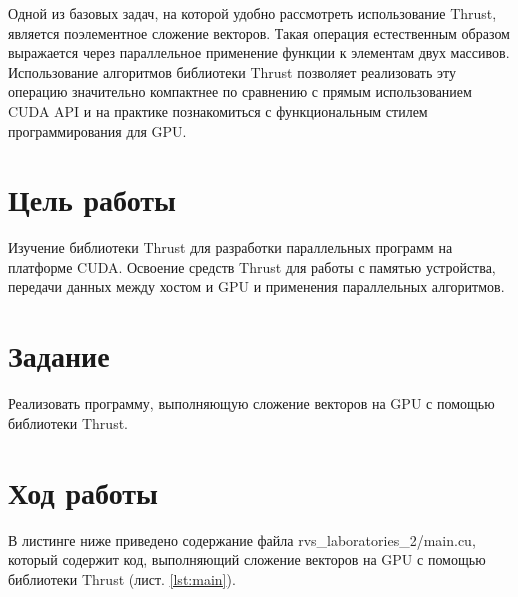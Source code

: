 \documentclass[14pt]{extarticle}
\makeatletter
\newcommand{\numbersections}{\renewcommand{\Hy@numberline}[1]{##1~}}
\let\oldsection\section
\renewcommand{\section}{\numbersections\oldsection}
\makeatother
\begin{document}
Одной из базовых задач, на которой удобно рассмотреть использование Thrust, является поэлементное сложение векторов. Такая операция естественным образом выражается через параллельное применение функции к элементам двух массивов. Использование алгоритмов библиотеки Thrust позволяет реализовать эту операцию значительно компактнее по сравнению с прямым использованием CUDA API и на практике познакомиться с функциональным стилем программирования для GPU.

\section{Цель работы}

Изучение библиотеки Thrust для разработки параллельных программ на платформе CUDA. Освоение средств Thrust для работы с памятью устройства, передачи данных между хостом и GPU и применения параллельных алгоритмов.

\section{Задание}

Реализовать программу, выполняющую сложение векторов на GPU с помощью библиотеки Thrust.

\section{Ход работы}

В листинге ниже приведено содержание файла rvs\_laboratories\_2/main.cu, который содержит код, выполняющий сложение векторов на GPU с помощью библиотеки Thrust (лист. \ref{lst:main}).
\end{document}
